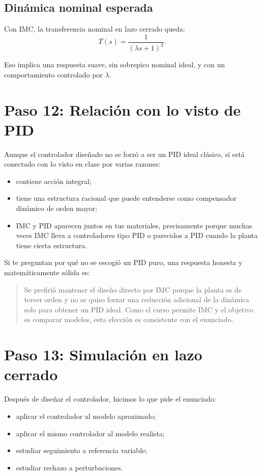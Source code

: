 \documentclass[11pt]{article}
\begin{document}
\subsection{Din\'amica nominal esperada}

Con IMC, la transferencia nominal en lazo cerrado queda:
\[
T(s)=\frac{1}{(\lambda s+1)^3}.
\]

Eso implica una respuesta suave, sin sobrepico nominal ideal, y con un comportamiento controlado por $\lambda$.

\section{Paso 12: Relaci\'on con lo visto de PID}

Aunque el controlador dise\~nado no se forz\'o a ser un PID ideal cl\'asico, s\'i est\'a conectado con lo visto en clase por varias razones:

\begin{itemize}[leftmargin=1.2cm]
\item contiene acci\'on integral;
\item tiene una estructura racional que puede entenderse como compensador din\'amico de orden mayor;
\item IMC y PID aparecen juntos en tus materiales, precisamente porque muchas veces IMC lleva a controladores tipo PID o parecidos a PID cuando la planta tiene cierta estructura.
\end{itemize}

Si te preguntan por qu\'e no se escogi\'o un PID puro, una respuesta honesta y matem\'aticamente s\'olida es:

\begin{quote}
Se prefiri\'o mantener el dise\~no directo por IMC porque la planta es de tercer orden y no se quiso forzar una reducci\'on adicional de la din\'amica solo para obtener un PID ideal. Como el curso permite IMC y el objetivo es comparar modelos, esta elecci\'on es consistente con el enunciado.
\end{quote}

\section{Paso 13: Simulaci\'on en lazo cerrado}

Despu\'es de dise\~nar el controlador, hicimos lo que pide el enunciado:

\begin{itemize}[leftmargin=1.2cm]
\item aplicar el controlador al modelo aproximado;
\item aplicar el mismo controlador al modelo realista;
\item estudiar seguimiento a referencia variable;
\item estudiar rechazo a perturbaciones.
\end{itemize}
\end{document}
